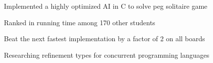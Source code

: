 \documentclass[letterpaper]{deedy-resume} %
\begin{document}
\begin{minipage}[t]{0.66\textwidth}
\sectionspace %



\begin{tightitemize}
\item Implemented a highly optimized AI in C to solve peg solitaire game
\item Ranked  in running time among 170 other students
\item Beat the next fastest implementation by a factor of 2 on all boards
\end{tightitemize}

\sectionspace %



\begin{tightitemize}
\item Researching refinement types for concurrent programming languages
\end{tightitemize}


\end{minipage} %
\hfill
%
%
\end{document}
